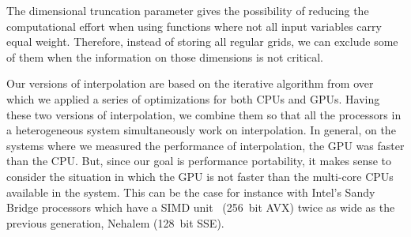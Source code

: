 The dimensional truncation parameter gives the possibility of reducing the
computational effort when using functions where not all input variables carry
equal weight. Therefore, instead of storing all regular grids, we can exclude
some of them when the information on those dimensions is not critical.

Our versions of interpolation are based on the iterative algorithm from
\cite{Murarasu:2011:CDS:1941553.1941559} over which we applied a series of
optimizations for both CPUs and GPUs. Having these two versions of
interpolation, we combine them so that all the processors in a heterogeneous
system simultaneously work on interpolation. In general, on the systems where we
measured the performance of interpolation, the GPU was faster than the CPU. But,
since our goal is performance portability, it makes sense to consider the
situation in which the GPU is not faster than the multi-core CPUs available in
the system. This can be the case for instance with Intel's Sandy Bridge
processors which have a SIMD unit~\cite{avx} (256~bit AVX) twice as wide as the
previous generation, Nehalem (128~bit SSE).






